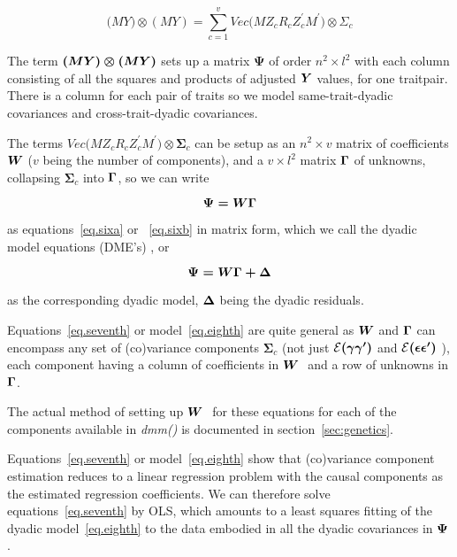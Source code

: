 \documentclass[titlepage]{article}  %
\begin{document}
\begin{equation}
{\bm (MY)\otimes(MY) = } \sum_{c=1}^{v} Vec{\bm (MZ_{c} R_{c} Z_{c}^{\prime}M^{\prime}) \otimes \Sigma_{c}}       \label{eq.sixb}
\end{equation}



The term $\mbox{\boldmath $(MY)\otimes(MY)$}$ sets up a matrix ${\bm \Psi}$ of order $n^{2}\times l^{2}$ with each column consisting of all the squares and products of adjusted $\mbox{\boldmath $Y$}$ values, for one traitpair. There is a column for each pair of traits so we model same-trait-dyadic covariances and cross-trait-dyadic covariances.

The terms $Vec{\bm (MZ_{c} R_{c} Z_{c}^{\prime}M^{\prime})} \otimes {\bm \Sigma_{c}}$  can be setup as an $n^{2}\times v$ matrix of coefficients $\mbox{\boldmath $W$}$ ($v$ being the number of components), and a $v\times l^{2}$ matrix $\mbox{\boldmath $\Gamma$}$ of unknowns, collapsing ${\bm \Sigma_{c}}$ into $\mbox{\boldmath $\Gamma$}$, so we can write

\begin{equation}
\mbox{\boldmath $\Psi = W \Gamma$}   \label{eq.seventh}
\end{equation}

as equations~\ref{eq.sixa} or ~\ref{eq.sixb} in matrix form, which we call the dyadic model equations (DME's) , or

\begin{equation}
\mbox{\boldmath $\Psi = W \Gamma + \Delta$}   \label{eq.eighth}
\end{equation}

as the corresponding dyadic model, $\mbox{\boldmath $\Delta$}$ being the dyadic residuals.

Equations~\ref{eq.seventh} or model~\ref{eq.eighth} are quite general as $\mbox{\boldmath $W$}$ and $\mbox{\boldmath $\Gamma$}$ can encompass any set of (co)variance components ${\bm \Sigma_{c}}$ (not just ${\cal E}\mbox{\boldmath $(\gamma \gamma^{\prime})$}$ and ${\cal E}\mbox{\boldmath $(\epsilon \epsilon^{\prime})$}$ ), each component having a column of coefficients in $\mbox{\boldmath $W$ }$ and a row of unknowns in $\mbox{\boldmath $\Gamma$}$.

The actual method of setting up $\mbox{\boldmath $W$ }$ for these equations for each of the components available in {\em dmm()} is documented in section~\ref{sec:genetics}. 

Equations~\ref{eq.seventh} or model~\ref{eq.eighth} show that (co)variance component estimation reduces to a linear regression problem with the causal components as the estimated regression coefficients. We can therefore solve equations~\ref{eq.seventh} by OLS, which amounts to a least squares fitting of the dyadic model~\ref{eq.eighth} to the data embodied in all the dyadic covariances in $\mbox{\boldmath $\Psi$}$.
\end{document}
